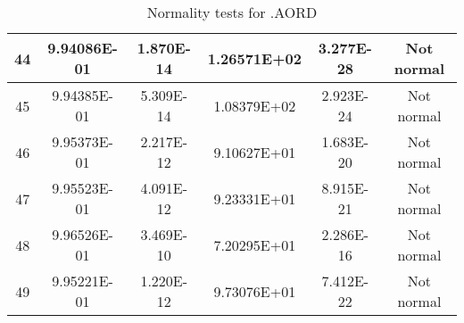 \begin{table}[h]
\begin{tabular}{|c|c|c|c|c|c|}
		44 & 9.94086E-01 & 1.870E-14 & 1.26571E+02 & 3.277E-28 & Not normal\\\hline
		45 & 9.94385E-01 & 5.309E-14 & 1.08379E+02 & 2.923E-24 & Not normal\\\hline
		46 & 9.95373E-01 & 2.217E-12 & 9.10627E+01 & 1.683E-20 & Not normal\\\hline
		47 & 9.95523E-01 & 4.091E-12 & 9.23331E+01 & 8.915E-21 & Not normal\\\hline
		48 & 9.96526E-01 & 3.469E-10 & 7.20295E+01 & 2.286E-16 & Not normal\\\hline
		49 & 9.95221E-01 & 1.220E-12 & 9.73076E+01 & 7.412E-22 & Not normal\\\hline
	\end{tabular}
	\caption{Normality tests for .AORD}
\end{table}
